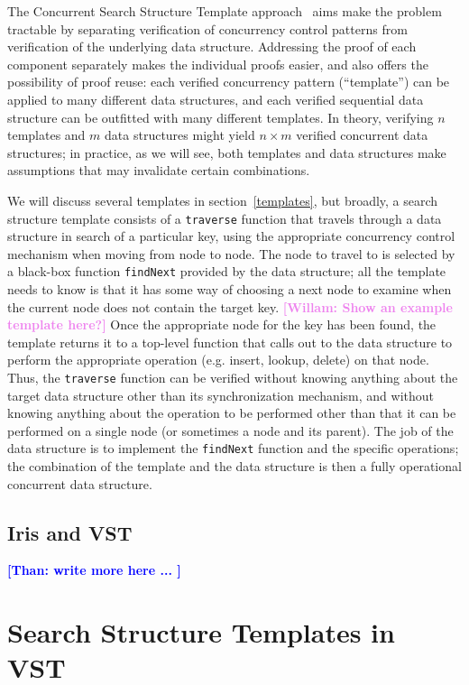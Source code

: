 \documentclass[a4paper,UKenglish,cleveref, autoref, thm-restate]{lipics-v2021}
\newcommand{\than}[1]{\textbf{\textcolor{blue}{[Than: #1]}}}
\newcommand{\wm}[1]{\textbf{\textcolor{violet}{[Willam: #1]}}}
\begin{document}
The Concurrent Search Structure Template approach~\cite{templates} aims make the problem tractable by separating verification of concurrency control patterns from verification of the underlying data structure. Addressing the proof of each component separately makes the individual proofs easier, and also offers the possibility of proof reuse: each verified concurrency pattern (``template'') can be applied to many different data structures, and each verified sequential data structure can be outfitted with many different templates. In theory, verifying $n$ templates and $m$ data structures might yield $n \times m$ verified concurrent data structures; in practice, as we will see, both templates and data structures make assumptions that may invalidate certain combinations. %

We will discuss several templates in section~\ref{templates}, but broadly, a search structure template consists of a \lstinline{traverse} function that travels through a data structure in search of a particular key, using the appropriate concurrency control mechanism when moving from node to node. The node to travel to is selected by a black-box function \lstinline{findNext} provided by the data structure; all the template needs to know is that it has some way of choosing a next node to examine when the current node does not contain the target key. \wm{Show an example template here?} Once the appropriate node for the key has been found, the template returns it to a top-level function that calls out to the data structure to perform the appropriate operation (e.g. insert, lookup, delete) on that node. Thus, the \lstinline{traverse} function can be verified without knowing anything about the target data structure other than its synchronization mechanism, and without knowing anything about the operation to be performed other than that it can be performed on a single node (or sometimes a node and its parent). The job of the data structure is to implement the \lstinline{findNext} function and the specific operations; the combination of the template and the data structure is then a fully operational concurrent data structure. %

\subsection{Iris and VST}
\than{write more here ... }

\section{Search Structure Templates in VST}
\end{document}
